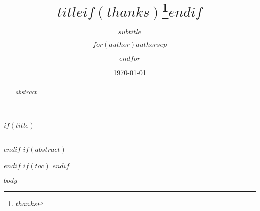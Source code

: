 \documentclass[10pt]{article}
\title{$title$$if(thanks)$\thanks{$thanks$}$endif$}
\subtitle{$subtitle$}
\author{$for(author)$$author$$sep$ \and $endfor$}
\date{\today}
\newcommand{\sep}[2]{\noindent\rule{\textwidth}{#1pt}\vspace{#2pt}}
\begin{document}
$if(title)$
\maketitle
\sep{5}{20}
$endif$
$if(abstract)$
\begin{abstract}
$abstract$
\end{abstract}
$endif$
$if(toc)$
\tableofcontents
\newpage
$endif$

$body$
\end{document}
